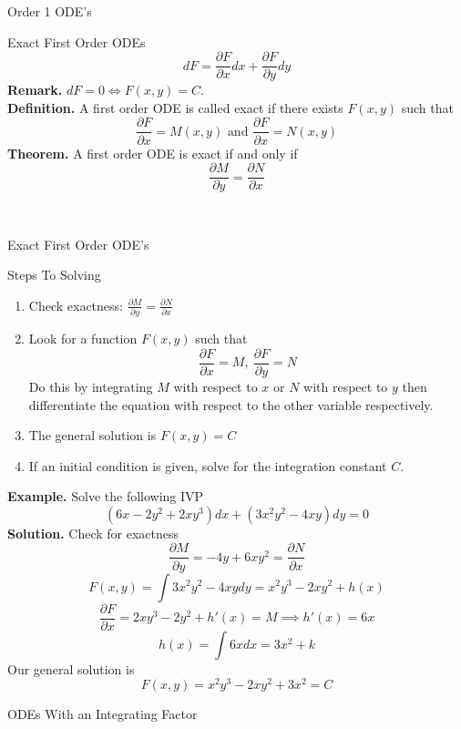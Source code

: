 \documentclass{article}
\begin{document}
\begin{multicols*}{3}
\begin{blackbox}{Order 1 ODE's}
\begin{bluebox}{Exact First Order ODEs}
        \[dF = \frac{\partial F}{\partial x} dx + \frac{\partial F}{\partial y}dy\]
        \textbf{Remark.} $dF = 0 \iff F(x,y) = C$.\\[1ex]
        \textbf{Definition.} A first order ODE is called exact if there exists $F(x,y)$ such that 
        \[\frac{\partial F}{\partial x} = M(x,y) \text{ and } \frac{\partial F}{\partial x} = N(x,y)\]
        \textbf{Theorem.} A first order ODE is exact if and only if
        \[\frac{\partial M}{\partial y} = \frac{\partial N}{\partial x}\]
    \end{bluebox}\\[-2ex]
\end{blackbox}
\begin{blackbox}{Exact First Order ODE's}
    \begin{bluebox}{Steps To Solving}
        \begin{enumerate}[align=left]
            \item Check exactness: $\frac{\partial M}{\partial y} = \frac{\partial N}{\partial x}$
            \item Look for a function $F(x,y)$ such that\\[-0.0001mm]
            \[\frac{\partial F}{\partial x} = M, \ \frac{\partial F}{\partial y} = N\]
            Do this by integrating $M$ with respect to $x$ or $N$ with respect to $y$ then differentiate the equation with respect to the other variable respectively.
            \item The general solution is $F(x,y) = C$
            \item If an initial condition is given, solve for the integration constant $C$.
        \end{enumerate}
    \end{bluebox}
    {\footnotesize
    \textbf{Example.} Solve the following IVP \\[-2ex]
    \[(6x - 2y^2 + 2xy^3)dx + (3x^2y^2-4xy)dy = 0\]
    \textbf{Solution.} Check for exactness \\[-2ex]
    \[\frac{\partial M}{\partial y} = -4y + 6xy^2 = \frac{\partial N}{\partial x}\]
    \[F(x,y) = \int 3x^2y^2 - 4xydy = x^2y^3 - 2xy^2 + h(x)\]
    \[\frac{\partial F}{\partial x} = 2xy^3 - 2y^2 + h'(x) = M \implies h'(x) = 6x\]
    \[h(x) = \int 6xdx = 3x^2 + k\]
    Our general solution is  \\[-2ex] 
    \[F(x,y) = x^2y^3 - 2xy^2 + 3x^2 = C\]
    }
\end{blackbox} 
\begin{blackbox}{ODEs With an Integrating Factor}

\end{blackbox}
\end{multicols*}
\end{document}
